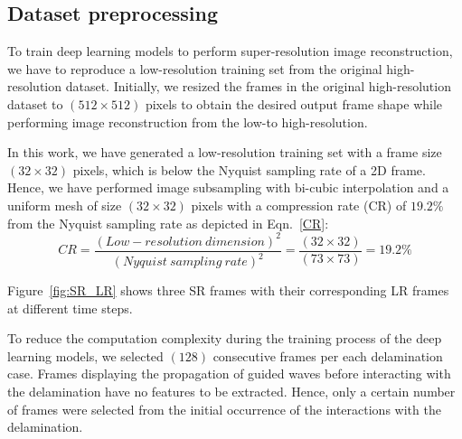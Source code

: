 \subsection{Dataset preprocessing}
To train deep learning models to perform super-resolution image reconstruction, we have to reproduce a low-resolution training set from the original high-resolution dataset. 
Initially, we resized the frames in the original high-resolution dataset to \((512\times512)\) pixels to obtain the desired output frame shape while performing image reconstruction from the low-to high-resolution.

In this work, we have generated a low-resolution training set with a frame size \((32\times32)\) pixels, which is below the Nyquist sampling rate of a 2D frame.
Hence, we have performed image subsampling with bi-cubic interpolation and a uniform mesh of size \((32\times32)\) pixels with a compression rate (CR) of \(19.2\%\) from the Nyquist sampling rate as depicted in Eqn.~\ref{CR}:
\begin{equation}
	CR = \frac{(Low-resolution\ dimension)^2}{(Nyquist\ sampling\ rate)^2} = \frac{(32\times32)}{(73\times73)}=19.2\%
	\label{CR}
\end{equation}

Figure~\ref{fig:SR_LR} shows three SR frames with their corresponding LR frames at different time steps.

To reduce the computation complexity during the training process of the deep learning models, we selected \((128)\) consecutive frames per each delamination case.
Frames displaying the propagation of guided waves before interacting with the delamination have no features to be extracted. 
Hence, only a certain number of frames were selected from the initial occurrence of the interactions with the delamination.

